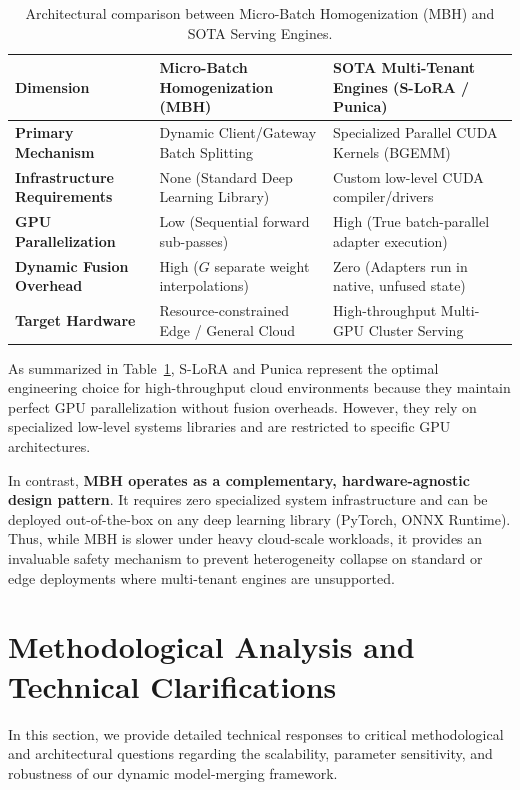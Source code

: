 \documentclass{article}
\theoremstyle{plain}
\theoremstyle{definition}
\theoremstyle{remark}
\begin{document}
\begin{table}[t]
\centering
\caption{Architectural comparison between Micro-Batch Homogenization (MBH) and SOTA Serving Engines.}
\label{tab:serving_comparison}
\vskip 0.15in
\begin{tabular}{p{3.0cm}p{5.8cm}p{6.6cm}}
\toprule
Dimension & Micro-Batch Homogenization (MBH) & SOTA Multi-Tenant Engines (S-LoRA / Punica) \\
\midrule
\textbf{Primary Mechanism} & Dynamic Client/Gateway Batch Splitting & Specialized Parallel CUDA Kernels (BGEMM) \\
\textbf{Infrastructure Requirements} & None (Standard Deep Learning Library) & Custom low-level CUDA compiler/drivers \\
\textbf{GPU Parallelization} & Low (Sequential forward sub-passes) & High (True batch-parallel adapter execution) \\
\textbf{Dynamic Fusion Overhead} & High ($G$ separate weight interpolations) & Zero (Adapters run in native, unfused state) \\
\textbf{Target Hardware} & Resource-constrained Edge / General Cloud & High-throughput Multi-GPU Cluster Serving \\
\bottomrule
\end{tabular}
\end{table}

As summarized in Table~\ref{tab:serving_comparison}, S-LoRA and Punica represent the optimal engineering choice for high-throughput cloud environments because they maintain perfect GPU parallelization without fusion overheads. However, they rely on specialized low-level systems libraries and are restricted to specific GPU architectures.

In contrast, \textbf{MBH operates as a complementary, hardware-agnostic design pattern}. It requires zero specialized system infrastructure and can be deployed out-of-the-box on any deep learning library (PyTorch, ONNX Runtime). Thus, while MBH is slower under heavy cloud-scale workloads, it provides an invaluable safety mechanism to prevent heterogeneity collapse on standard or edge deployments where multi-tenant engines are unsupported.

\section{Methodological Analysis and Technical Clarifications}
\label{app:clarifications}

In this section, we provide detailed technical responses to critical methodological and architectural questions regarding the scalability, parameter sensitivity, and robustness of our dynamic model-merging framework.
\end{document}
